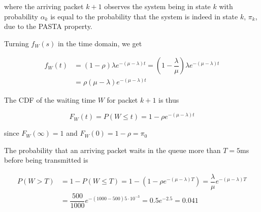 where the arriving packet $k+1$ observes the system being in state $k$ with
probability $\alpha_k$ is equal to the probability that the system is indeed in
state $k$, $\pi_k$, due to the PASTA property.

Turning $f_W(s)$ in the time domain, we get

\begin{align*}
  f_W(t) &= (1-\rho) \lambda e^{-(\mu - \lambda)t} = (1-\dfrac{\lambda}{\mu}) \lambda e^{-(\mu - \lambda)t} \\
         &= \rho(\mu - \lambda) e^{-(\mu - \lambda)t}
\end{align*}

The CDF of the waiting time $W$ for packet $k+1$ is thus

$$F_W(t) = P(W \leq t) = 1 - \rho e^{-(\mu - \lambda)t}$$

since $F_W(\infty) = 1$ and $F_W(0) = 1-\rho = \pi_0$

The probability that an arriving packet waits in the queue more than $T = 5$ms
before being transmitted is

\begin{align*}
  P(W > T) &= 1 - P(W \leq T) = 1- (1-\rho e^{-(\mu - \lambda)T}) = \dfrac{\lambda}{\mu}e^{-(\mu - \lambda)T} \\
           &= \dfrac{500}{1000} e^{-(1000 - 500) 5 \cdot 10^{-3}} = 0.5 e^{-2.5} = 0.041
\end{align*}
